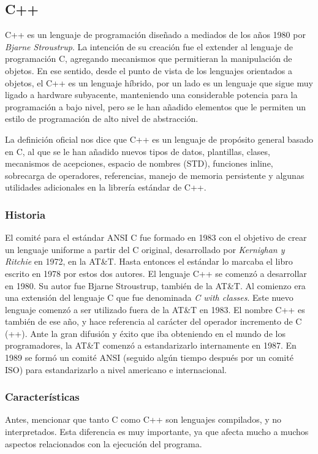 \documentclass[12pt]{book} %
\begin{document}
	\subsection{C++}
		\textsc{C++} es un lenguaje de programación diseñado a mediados de los años 1980 por \textit{Bjarne Stroustrup}. La intención 
		de su creación fue el extender al lenguaje de programación \textsc{C}, agregando mecanismos que permitieran la manipulación de
		objetos. En ese sentido, desde el punto de vista de los lenguajes orientados a objetos, el C++ es un lenguaje híbrido, por un lado 
		es un lenguaje que sigue muy ligado a hardware subyacente, manteniendo una considerable potencia para la programación a bajo nivel, 
		pero se le han añadido elementos que le permiten un estilo de programación de alto nivel de abstracción.
		
		La definición oficial nos dice que C++ es un lenguaje de propósito general basado en C, al que se le han añadido nuevos tipos de 
		datos, plantillas, clases, mecanismos de acepciones, espacio de nombres (STD), funciones inline, sobrecarga de operadores, 
		referencias, manejo de memoria persistente y algunas utilidades adicionales en la librería estándar de C++.
		
		\subsubsection{Historia}
			El comité para el estándar ANSI C fue formado en 1983 con el objetivo de crear un lenguaje uniforme a partir del C original,
			desarrollado por \textit{Kernighan y Ritchie} en 1972, en la AT\&T. Hasta entonces el estándar lo marcaba el libro escrito en
			1978 por estos dos autores. 
			El lenguaje C++ se comenzó a desarrollar en 1980. Su autor fue Bjarne Stroustrup, también de la AT\&T. 
			Al comienzo era una extensión del lenguaje C que fue denominada \textit{C with classes}. Este nuevo lenguaje comenzó a ser
			utilizado fuera de la AT\&T en 1983. El nombre C++ es también de ese año, y hace referencia al carácter del operador incremento
			de C (++). Ante la gran difusión y éxito que iba obteniendo en el mundo de los programadores, la AT\&T comenzó a estandarizarlo
			internamente en 1987. En 1989 se formó un comité ANSI (seguido algún tiempo después por un comité ISO) para estandarizarlo a
			nivel americano e internacional.
			
		 \subsubsection{Características}
		 	Antes, mencionar que tanto C como C++ son lenguajes compilados, y no interpretados. Esta diferencia es muy importante, ya que
		 	afecta mucho a muchos aspectos relacionados con la ejecución del programa.\\
		 	
\end{document}
